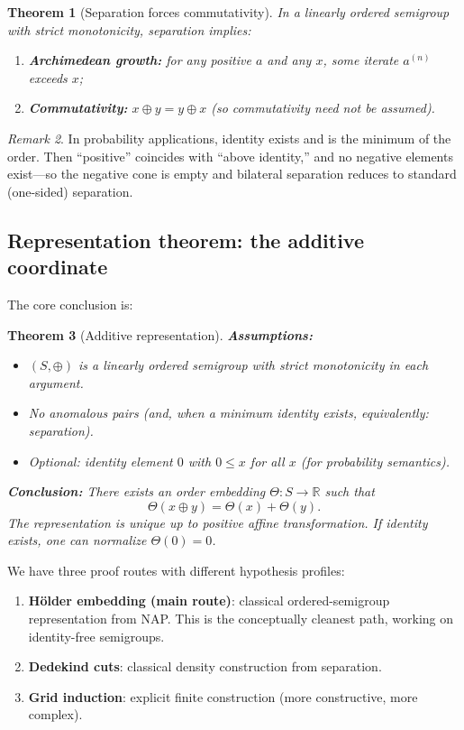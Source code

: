 \documentclass[11pt]{article}
\newtheorem{theorem}{Theorem}[section]
\theoremstyle{definition}
\theoremstyle{remark}
\newtheorem{remark}[theorem]{Remark}
\begin{document}
\begin{theorem}[Separation forces commutativity]
\label{thm:separation-commutativity}
In a linearly ordered semigroup with strict monotonicity, separation implies:
\begin{enumerate}
\item \textbf{Archimedean growth:} for any positive $a$ and any $x$, some iterate $a^{(n)}$ exceeds $x$;
\item \textbf{Commutativity:} $x\oplus y = y\oplus x$ (so commutativity need not be assumed).
\end{enumerate}
\end{theorem}

\begin{remark}
In probability applications, identity exists and is the minimum of the order. Then ``positive''
coincides with ``above identity,'' and no negative elements exist---so the negative cone is empty
and bilateral separation reduces to standard (one-sided) separation.
\end{remark}

\subsection{Representation theorem: the additive coordinate}

The core conclusion is:

\begin{theorem}[Additive representation]
\textbf{Assumptions:}
\begin{itemize}
\item $(S,\oplus)$ is a linearly ordered semigroup with strict monotonicity in each argument.
\item No anomalous pairs (and, when a minimum identity exists, equivalently: separation).
\item Optional: identity element $0$ with $0\le x$ for all $x$ (for probability semantics).
\end{itemize}
\textbf{Conclusion:}
There exists an order embedding $\Theta : S \to \mathbb{R}$ such that
\[
\Theta(x\oplus y) = \Theta(x) + \Theta(y).
\]
The representation is unique up to positive affine transformation.
If identity exists, one can normalize $\Theta(0)=0$.
\end{theorem}

We have three proof routes with different hypothesis profiles:
\begin{enumerate}
\item \textbf{H\"older embedding (main route)}: classical ordered-semigroup representation from NAP.
  This is the conceptually cleanest path, working on identity-free semigroups.
\item \textbf{Dedekind cuts}: classical density construction from separation.
\item \textbf{Grid induction}: explicit finite construction (more constructive, more complex).
\end{enumerate}
\end{document}

